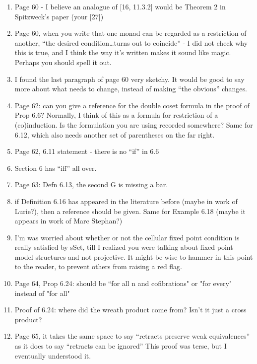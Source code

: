 \documentclass{article}
\begin{document}
\begin{enumerate}
\item
Page 60 - I believe an analogue of [16, 11.3.2] would be Theorem 2 in Spitzweck's paper (your [27])

\item
Page 60, when you write that one monad can be regarded as a restriction of another, ``the desired condition\dots turns out to coincide'' - I did not check why this is true, and I think the way it's written makes it sound like magic. Perhaps you should spell it out.

\item
I found the last paragraph of page 60 very sketchy. It would be good to say more about what needs to change, instead of making ``the obvious'' changes.

\item
Page 62: can you give a reference for the double coset formula in the proof of Prop 6.6? Normally, I think of this as a formula for restriction of a (co)induction. Is the formulation you are using recorded somewhere?
Same for 6.12, which also needs another set of parentheses on the far right.

\item
Page 62, 6.11 statement - there is no ``if'' in 6.6

\item
Section 6 has ``iff'' all over.

\item
Page 63: Defn 6.13, the second G is missing a bar.

\item if Definition 6.16 has appeared in the literature before (maybe in work of Lurie?), then a reference should be given. Same for Example 6.18 (maybe it appears in work of Marc Stephan?)

\item I'm was worried about whether or not the cellular fixed point condition is really satisfied by sSet, till I realized you were talking about fixed point model structures and not projective. It might be wise to hammer in this point to the reader, to prevent others from raising a red flag.

\item
Page 64, Prop 6.24: should be ``for all n and cofibrations" or "for every" instead of "for all"

\item
Proof of 6.24: where did the wreath product come from? Isn't it just a cross product?

\item
Page 65, it takes the same space to say ``retracts preserve weak equivalences'' as it does to say ``retracts can be ignored''
This proof was terse, but I eventually understood it.


\end{enumerate}
\end{document}
